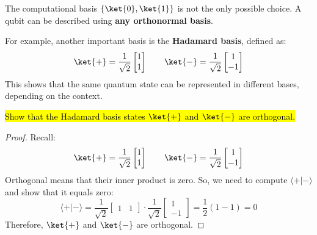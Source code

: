 \highspace
\begin{examplebox}
    The computational basis $\{\ket{0}, \ket{1}\}$ is not the only possible choice. A qubit can be described using \textbf{any orthonormal basis}.

    \highspace
    For example, another important basis is the \textbf{Hadamard basis}, defined as:
    \begin{equation*}
        \ket{+} = \frac{1}{\sqrt{2}}
        \begin{bmatrix}
            1 \\ 1
        \end{bmatrix}
        \hspace{2em}
        \ket{-} = \frac{1}{\sqrt{2}}
        \begin{bmatrix}
            1 \\ -1
        \end{bmatrix}
    \end{equation*}
    This shows that the same quantum state can be represented in different bases, depending on the context.
\end{examplebox}

\begin{examplebox}
    \hl{Show that the Hadamard basis states $\ket{+}$ and $\ket{-}$ are orthogonal.}

    \begin{proof}
        Recall:
        \begin{equation*}
            \ket{+} = \frac{1}{\sqrt{2}}
            \begin{bmatrix}
                1 \\ 1
            \end{bmatrix}
            \hspace{2em}
            \ket{-} = \frac{1}{\sqrt{2}}
            \begin{bmatrix}
                1 \\ -1
            \end{bmatrix}
        \end{equation*}
        Orthogonal means that their inner product is zero. So, we need to compute $\langle + | - \rangle$ and show that it equals zero:
        \begin{equation*}
            \langle + | - \rangle =
            \frac{1}{\sqrt{2}} \begin{bmatrix}
                1 & 1
            \end{bmatrix}
            \cdot
            \frac{1}{\sqrt{2}}
            \begin{bmatrix}
                1 \\ -1
            \end{bmatrix}
            = \dfrac{1}{2}\left(1 - 1\right) = 0
        \end{equation*}
        Therefore, $\ket{+}$ and $\ket{-}$ are orthogonal.
    \end{proof}
\end{examplebox}

